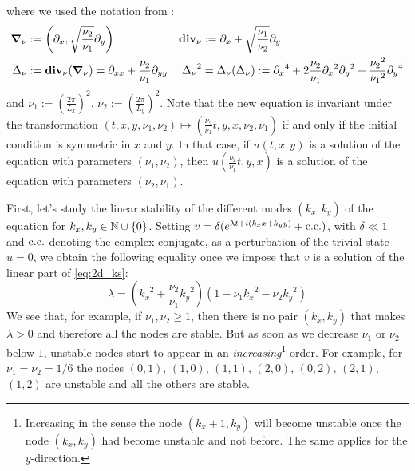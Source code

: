 \documentclass[twoside]{article}
\begin{document}
where we used the notation from \cite{Kalogirou2015}:
\begin{align}
  \grad_\nu & := \left(\partial_x , \sqrt{\frac{\nu_2}{\nu_1}} \partial_y
  \right)   & \operatorname{\boldsymbol{\mathrm{div}}}_\nu                                                    & := \partial_x + \sqrt{\frac{\nu_1}{\nu_2}} \partial_y
  \\ \Delta_\nu &:= \operatorname{\boldsymbol{\mathrm{div}}}_\nu(\grad_\nu) = \partial_{xx} + \frac{\nu_2}{\nu_1} \partial_{yy} & {\Delta_\nu}^2 &= \Delta_\nu(\Delta_\nu) := {\partial_{x}}^4 + 2 \frac{\nu_2}{\nu_1} {\partial_{x}}^2{\partial_{y}}^2 + \frac{{\nu_2}^2}{{\nu_1}^2} {\partial_{y}}^4
\end{align}
and $\nu_1 :={\left( \frac{2\pi}{L_x} \right)}^2$, $\nu_2 := {\left( \frac{2\pi}{L_y} \right)}^2$. Note that the new equation is invariant under the transformation $(t,x,y, \nu_1, \nu_2) \mapsto \left( \frac{\nu_2}{\nu_1} t, y, x, \nu_2, \nu_1 \right)$ if and only if the initial condition is symmetric in $x$ and $y$. In that case, if $u(t,x,y)$ is a solution of the equation with parameters $(\nu_1, \nu_2)$, then $u\left( \frac{\nu_2}{\nu_1} t, y, x \right)$ is a solution of the equation with parameters $(\nu_2, \nu_1)$.

First, let's study the linear stability of the different modes $(k_x, k_y)$ of the equation for $k_x,k_y\in\mathbb{N}\cup\{0\}$. Setting $v = \delta(e^{\lambda t+i(k_x x + k_y y)} + \mathrm{c.c.})$, with $\delta \ll 1$ and $\mathrm{c.c.}$ denoting the complex conjugate, as a perturbation of the trivial state $u = 0$, we obtain the following equality once we impose that $v$ is a solution of the linear part of \cref{eq:2d_ks}:
\begin{equation}\label{eq:linear_stability}
  \lambda = \left({k_x}^2+ \frac{\nu_2}{\nu_1} {k_y}^2\right)\left( 1 - \nu_1{k_x}^2 - \nu_2{k_y}^2\right)
\end{equation}
We see that, for example, if $\nu_1, \nu_2 \geq 1$, then there is no pair $(k_x, k_y)$ that makes $\lambda > 0$ and therefore all the nodes are stable. But as soon as we decrease $\nu_1$ or $\nu_2$ below $1$, unstable nodes start to appear in an \emph{increasing}\footnote{Increasing in the sense the node $(k_x+1,k_y)$ will become unstable once the node $(k_x,k_y)$ had become unstable and not before. The same applies for the $y$-direction.} order. For example, for $\nu_1=\nu_2=1/6$ the nodes $(0,1)$, $(1,0)$, $(1,1)$, $(2,0)$, $(0,2)$, $(2,1)$, $(1,2)$ are unstable and all the others are stable.
\end{document}
